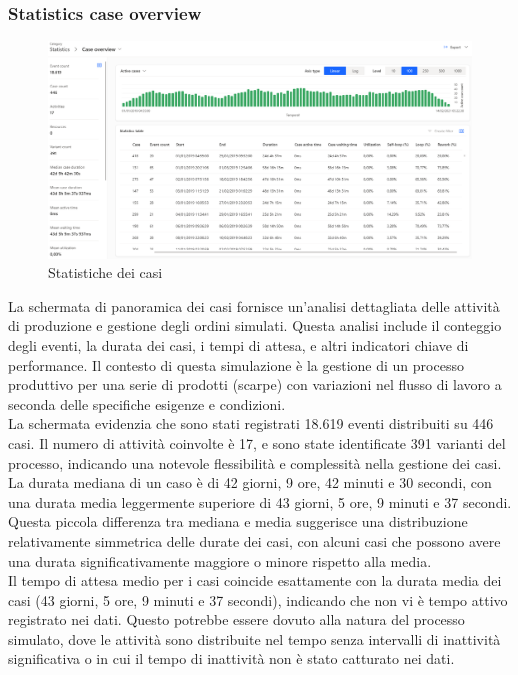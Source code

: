 \documentclass{article}
\begin{document}
\subsubsection{Statistics case overview}
\begin{figure}[H]
    \centering
    \includegraphics[width=\textwidth]{imgMicrosoft/SecondaSimulazione/StatisticsCaseOverviewSimulazione2.png}
    \caption{Statistiche dei casi}
    \label{fig:statistics-case-overview}
\end{figure}
La schermata di panoramica dei casi fornisce un'analisi dettagliata delle attività di produzione e gestione degli ordini simulati. Questa analisi include il conteggio degli eventi, la durata dei casi, i tempi di attesa, e altri indicatori chiave di performance. Il contesto di questa simulazione è la gestione di un processo produttivo per una serie di prodotti (scarpe) con variazioni nel flusso di lavoro a seconda delle specifiche esigenze e condizioni.\\
La schermata evidenzia che sono stati registrati 18.619 eventi distribuiti su 446 casi. Il numero di attività coinvolte è 17, e sono state identificate 391 varianti del processo, indicando una notevole flessibilità e complessità nella gestione dei casi.\\
La durata mediana di un caso è di 42 giorni, 9 ore, 42 minuti e 30 secondi, con una durata media leggermente superiore di 43 giorni, 5 ore, 9 minuti e 37 secondi. Questa piccola differenza tra mediana e media suggerisce una distribuzione relativamente simmetrica delle durate dei casi, con alcuni casi che possono avere una durata significativamente maggiore o minore rispetto alla media.\\
Il tempo di attesa medio per i casi coincide esattamente con la durata media dei casi (43 giorni, 5 ore, 9 minuti e 37 secondi), indicando che non vi è tempo attivo registrato nei dati. Questo potrebbe essere dovuto alla natura del processo simulato, dove le attività sono distribuite nel tempo senza intervalli di inattività significativa o in cui il tempo di inattività non è stato catturato nei dati.
\end{document}
